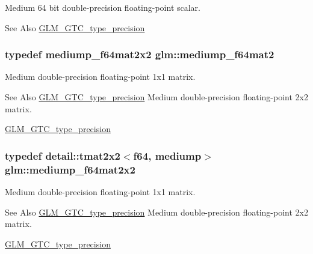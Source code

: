 Medium 64 bit double-\/precision floating-\/point scalar. \begin{DoxySeeAlso}{See Also}
\hyperlink{group__gtc__type__precision}{G\-L\-M\-\_\-\-G\-T\-C\-\_\-type\-\_\-precision} 
\end{DoxySeeAlso}
\hypertarget{group__gtc__type__precision_gaa7eac0340d2aaf670ec4dfbd1826fd35}{
\subsubsection[{mediump\-\_\-f64mat2}]{\setlength{\rightskip}{0pt plus 5cm}typedef mediump\-\_\-f64mat2x2 {\bf glm\-::mediump\-\_\-f64mat2}}}\label{group__gtc__type__precision_gaa7eac0340d2aaf670ec4dfbd1826fd35}
Medium double-\/precision floating-\/point 1x1 matrix. \begin{DoxySeeAlso}{See Also}
\hyperlink{group__gtc__type__precision}{G\-L\-M\-\_\-\-G\-T\-C\-\_\-type\-\_\-precision} Medium double-\/precision floating-\/point 2x2 matrix. 

\hyperlink{group__gtc__type__precision}{G\-L\-M\-\_\-\-G\-T\-C\-\_\-type\-\_\-precision} 
\end{DoxySeeAlso}
\hypertarget{group__gtc__type__precision_gacfa9f872c78d9e8b8e6c5dd0088db8fc}{
\subsubsection[{mediump\-\_\-f64mat2x2}]{\setlength{\rightskip}{0pt plus 5cm}typedef detail\-::tmat2x2$<$f64, mediump$>$ {\bf glm\-::mediump\-\_\-f64mat2x2}}}\label{group__gtc__type__precision_gacfa9f872c78d9e8b8e6c5dd0088db8fc}
Medium double-\/precision floating-\/point 1x1 matrix. \begin{DoxySeeAlso}{See Also}
\hyperlink{group__gtc__type__precision}{G\-L\-M\-\_\-\-G\-T\-C\-\_\-type\-\_\-precision} Medium double-\/precision floating-\/point 2x2 matrix. 

\hyperlink{group__gtc__type__precision}{G\-L\-M\-\_\-\-G\-T\-C\-\_\-type\-\_\-precision} 
\end{DoxySeeAlso}
